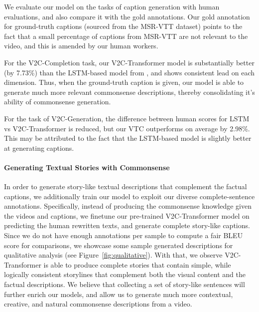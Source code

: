     We evaluate our model on the tasks of caption generation with human evaluations, and also compare it with the gold annotations. 
    Our gold annotation for ground-truth captions (sourced from the MSR-VTT dataset) points to the fact that a small percentage of captions from MSR-VTT are not relevant to the video, and this is amended by our human workers.
     
    For the  {V2C-Completion} task, our V2C-Transformer model is substantially better (by 7.73\%) than the LSTM-based model from \cite{gao2017video}, and shows consistent lead on each dimension. 
    Thus, when the ground-truth caption is given, our model is able to generate much more relevant commonsense descriptions, thereby consolidating it's ability of commonsense generation.
    
    For the task of  {V2C-Generation}, the difference between human scores for LSTM vs V2C-Transformer is reduced, but our VTC outperforms on average by 2.98\%.
    This may be attributed to the fact that the LSTM-based model is slightly better at generating captions.
   

    \paragraph{Generating Textual Stories with Commonsense}
    In order to generate story-like textual descriptions that complement the factual captions, we additionally train our model to exploit our diverse complete-sentence annotations.
    Specifically, instead of producing the commonsense knowledge given the videos and captions, we finetune our pre-trained V2C-Transformer model on predicting the human rewritten texts, and generate complete story-like captions.
    Since we do not have enough annotations per sample to compute a fair BLEU score for comparisons, we showcase some sample generated descriptions for qualitative analysis (see Figure~\ref{fig:qualitative}). 
    With that, we observe V2C-Transformer is able to produce complete stories that contain simple, while logically consistent storylines that complement both the visual content and the factual descriptions. 
    We believe that collecting a set of story-like sentences will further enrich our models, and allow us to generate much more contextual, creative, and natural commonsense descriptions from a video. 


